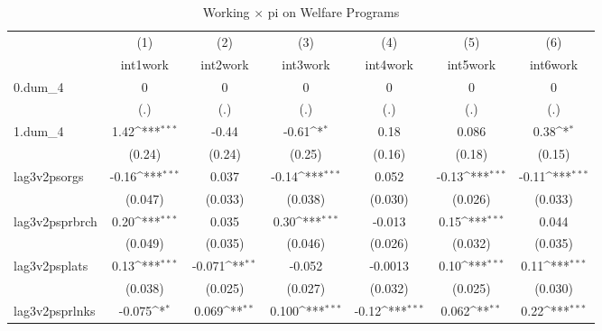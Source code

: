 \begin{table}[htbp]\centering
\def\sym#1{\ifmmode^{#1}\else\(^{#1}\)\fi}
\caption{Working $\times$ pi on Welfare Programs}
\begin{tabular}{l*{6}{c}}
\hline\hline
            &\multicolumn{1}{c}{(1)}         &\multicolumn{1}{c}{(2)}         &\multicolumn{1}{c}{(3)}         &\multicolumn{1}{c}{(4)}         &\multicolumn{1}{c}{(5)}         &\multicolumn{1}{c}{(6)}         \\
            &    int1work         &    int2work         &    int3work         &    int4work         &    int5work         &    int6work         \\
\hline
0.dum\_4     &           0         &           0         &           0         &           0         &           0         &           0         \\
            &         (.)         &         (.)         &         (.)         &         (.)         &         (.)         &         (.)         \\
[1em]
1.dum\_4     &        1.42\sym{***}&       -0.44         &       -0.61\sym{*}  &        0.18         &       0.086         &        0.38\sym{*}  \\
            &      (0.24)         &      (0.24)         &      (0.25)         &      (0.16)         &      (0.18)         &      (0.15)         \\
[1em]
lag3v2psorgs&       -0.16\sym{***}&       0.037         &       -0.14\sym{***}&       0.052         &       -0.13\sym{***}&       -0.11\sym{***}\\
            &     (0.047)         &     (0.033)         &     (0.038)         &     (0.030)         &     (0.026)         &     (0.033)         \\
[1em]
lag3v2psprbrch&        0.20\sym{***}&       0.035         &        0.30\sym{***}&      -0.013         &        0.15\sym{***}&       0.044         \\
            &     (0.049)         &     (0.035)         &     (0.046)         &     (0.026)         &     (0.032)         &     (0.035)         \\
[1em]
lag3v2psplats&        0.13\sym{***}&      -0.071\sym{**} &      -0.052         &     -0.0013         &        0.10\sym{***}&        0.11\sym{***}\\
            &     (0.038)         &     (0.025)         &     (0.027)         &     (0.032)         &     (0.025)         &     (0.030)         \\
[1em]
lag3v2psprlnks&      -0.075\sym{*}  &       0.069\sym{**} &       0.100\sym{***}&       -0.12\sym{***}&       0.062\sym{**} &        0.22\sym{***}\\

\end{tabular}
\end{table}
